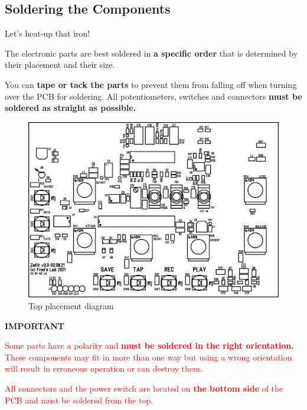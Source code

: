 \documentclass{scrartcl}
\begin{document}
\pagebreak
\subsection{Soldering the Components}
\Large
Let's heat-up that iron!
\normalsize

The electronic parts are best soldered in \textbf{a specific order} that is determined by their placement and their size.

You can \textbf{tape or tack the parts} to prevent them from falling off when turning over the PCB for soldering.
All potentiometers, switches and connectors \textbf{must be soldered as straight as possible.}

\begin{figure}[!ht]
    \begin{center}
        \includegraphics[scale=0.70]{assets/pcb-top.png}
        \caption{Top placement diagram}
    \end{center}
\end{figure}

\vspace{0.5cm}
\textbf{IMPORTANT}

\begin{tcolorbox}
    \textcolor{red}{
        Some parts have a polarity and \textbf{must be soldered in the right orientation.} These components may fit in more than one way but using a wrong orientation will result in erroneous operation or can destroy them.
    }
\end{tcolorbox}

\vspace{0.25cm}

\begin{tcolorbox}
    \textcolor{red}{
        All connectors and the power switch are located on \textbf{the bottom side} of the PCB and must be soldered from the top.
    }
\end{tcolorbox}
\end{document}
